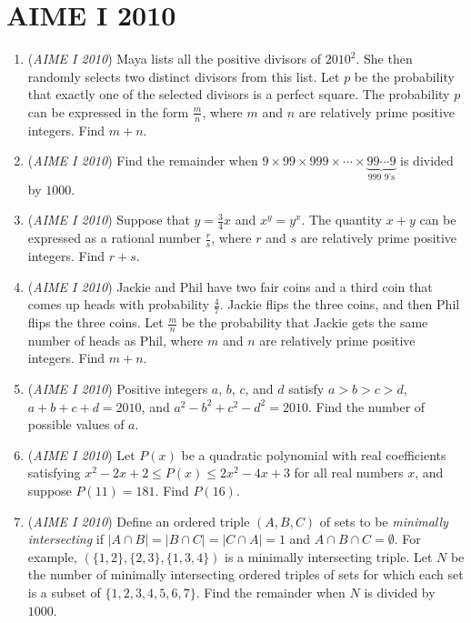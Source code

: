 \section{AIME I 2010}
        \begin{enumerate}
        	\item (\textit{AIME I 2010}) Maya lists all the positive divisors of $2010^2$. She then randomly selects two distinct divisors from this list. Let $p$ be the probability that exactly one of the selected divisors is a perfect square. The probability $p$ can be expressed in the form $\frac {m}{n}$, where $m$ and $n$ are relatively prime positive integers. Find $m + n$.


 

	\item (\textit{AIME I 2010}) Find the remainder when $9 \times 99 \times 999 \times \cdots \times \underbrace{99\cdots9}_{\text{999 9's}}$ is divided by $1000$.


 

	\item (\textit{AIME I 2010}) Suppose that $y = \frac34x$ and $x^y = y^x$. The quantity $x + y$ can be expressed as a rational number $\frac {r}{s}$, where $r$ and $s$ are relatively prime positive integers. Find $r + s$.


 

	\item (\textit{AIME I 2010}) Jackie and Phil have two fair coins and a third coin that comes up heads with probability $\frac47$. Jackie flips the three coins, and then Phil flips the three coins. Let $\frac {m}{n}$ be the probability that Jackie gets the same number of heads as Phil, where $m$ and $n$ are relatively prime positive integers. Find $m + n$.


 

	\item (\textit{AIME I 2010}) Positive integers $a$, $b$, $c$, and $d$ satisfy $a > b > c > d$, $a + b + c + d = 2010$, and $a^2 - b^2 + c^2 - d^2 = 2010$. Find the number of possible values of $a$.


 

	\item (\textit{AIME I 2010}) Let $P(x)$ be a quadratic polynomial with real coefficients satisfying $x^2 - 2x + 2 \le P(x) \le 2x^2 - 4x + 3$ for all real  numbers $x$, and suppose $P(11) = 181$. Find $P(16)$.


 

	\item (\textit{AIME I 2010}) Define an ordered triple $(A, B, C)$ of sets to be \textit{minimally intersecting} if $|A \cap B| = |B \cap C| = |C \cap A| = 1$ and $A \cap B \cap C = \emptyset$. For example, $(\{1,2\},\{2,3\},\{1,3,4\})$ is a minimally intersecting triple. Let $N$ be the number of minimally intersecting ordered triples of sets for which each set is a subset of $\{1,2,3,4,5,6,7\}$. Find the remainder when $N$ is divided by $1000$.



\end{enumerate}
